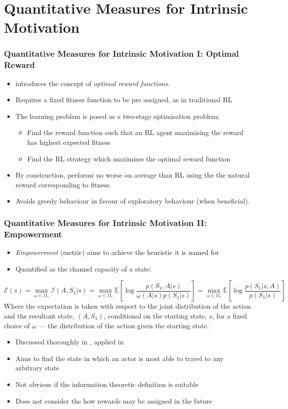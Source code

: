 \documentclass[aspectratio=169]{beamer}
\newcommand{\EE}{\mathbb{E}}
\newcommand{\Ii}{\mathcal{I}}
\newcommand{\Ee}{\mathcal{E}}
\begin{document}
\section{Quantitative Measures for Intrinsic Motivation}
\begin{frame}
	\frametitle{Quantitative Measures for Intrinsic Motivation I: Optimal Reward}
	\begin{itemize}
		\item \citet{singh2010intrinsically} introduces the concept of \textit{optimal reward functions}.
		\item Requires a fixed fitness function to be pre assigned, as in traditional RL\pause
		\item The learning problem is posed as a two-stage optimisation problem;\pause
		\begin{itemize}
			\item Find the reward function such that an RL agent maximising the reward has highest expected fitness\pause
			\item Find the RL strategy which maximises the optimal reward function
		\end{itemize}\pause		 
		\item By construction, performs no worse on average than RL using the the natural reward corresponding to fitness. 
		\item Avoids greedy behaviour in favour of exploratory behaviour (when beneficial).
	\end{itemize}
\end{frame}

\begin{frame}
	\frametitle{Quantitative Measures for Intrinsic Motivation II: Empowerment}
	\begin{itemize}
		\item \textit{Empowerment} (metric) aims to achieve the heuristic it is named for
		\item Quantified as the channel capacity of a state: 
	\end{itemize}
	\[\Ee(s)=\max_{\omega\in\Omega_s}\Ii(A,S_1|s)=\max_{\omega\in\Omega_s}\EE\left[\log\frac{p(S_1,A|s)}{\omega(A|s)p(S_1|s)}\right]=\max_{\omega\in\Omega_s}\EE\left[\log\frac{p(S_1|s,A)}{p(S_1|s)}\right] \]
	{\small Where the expectation is taken with respect to the joint distribution of the action and the resultant state, $(A,S_1)$, conditional on the starting state, $s$, for a fixed choice of $\omega$ --- the distribution of the action given the starting state.} \pause
	\begin{itemize}
		\item Discussed thoroughly in \citet{singh2010intrinsically}, applied in \citet{mohamed2015variational}
		\item Aims to find the state in which an actor is most able to travel to any arbitrary state\pause\vspace{0.5em}
		\item Not obvious if the information theoretic definition is suitable
		\item Does not consider the how rewards may be assigned in the future
	\end{itemize}
\end{frame}
\end{document}
